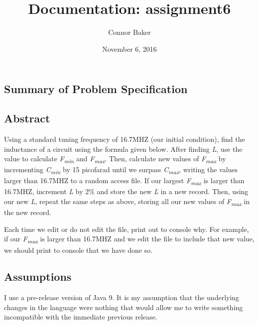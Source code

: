\documentclass[12pt]{article}
\begin{document}
\null
\nointerlineskip 
\vfill
\let \snewpage \newpage
\let \newpage \relax
    \title{Documentation: assignment6}
    \author{Connor Baker}
    \date{November 6, 2016}
\maketitle
\let \newpage \snewpage
\vfill



\newpage %


\makeatletter
\renewcommand*\l@section{\@dottedtocline{1}{0em}{1.5em}}
\makeatother

\tableofcontents
\clearpage

\begin{center}
\section{Summary of Problem Specification}
\end{center}
\subsection{Abstract}
Using a standard tuning frequency of 16.7MHZ (our initial condition), find the inductance of a circuit using the formula given below. After finding \textit{L}, use the value to calculate \textit{F\textsubscript{min}} and \textit{F\textsubscript{max}}. Then, calculate new values of \textit{F\textsubscript{max}} by incrementing \textit{C\textsubscript{min}} by 15 picofarad until we surpass \textit{C\textsubscript{max}}, writing the values larger than 16.7MHZ to a random access file. If our largest \textit{F\textsubscript{max}} is larger than 16.7MHZ, increment \textit{L} by 2\% and store the new \textit{L} in a new record. Then, using our new \textit{L}, repeat the same steps as above, storing all our new values of \textit{F\textsubscript{max}} in the new record.
\par %
Each time we edit or do not edit the file, print out to console why. For example, if our \textit{F\textsubscript{max}} is larger than 16.7MHZ and we edit the file to include that new value, we should print to console that we have done so.
\subsection{Assumptions}
I use a pre-release version of Java 9. It is my assumption that the underlying changes in the language were nothing that would allow me to write something incompatible with the immediate previous release.
\end{document}
